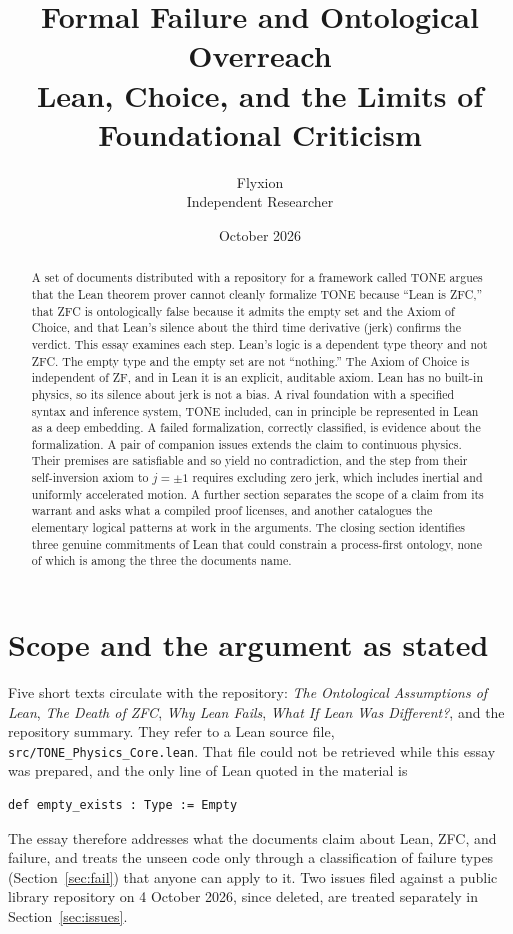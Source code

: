 \documentclass[11pt]{article}
\title{Formal Failure and Ontological Overreach\\[0.4em]\large Lean, Choice, and the Limits of Foundational Criticism}
\author{Flyxion\\Independent Researcher}
\date{October 2026}
\begin{document}
\maketitle

\begin{abstract}
\noindent A set of documents distributed with a repository for a framework called TONE argues that the Lean theorem prover cannot cleanly formalize TONE because ``Lean is ZFC,'' that ZFC is ontologically false because it admits the empty set and the Axiom of Choice, and that Lean's silence about the third time derivative (jerk) confirms the verdict. This essay examines each step. Lean's logic is a dependent type theory and not ZFC. The empty type and the empty set are not ``nothing.'' The Axiom of Choice is independent of ZF, and in Lean it is an explicit, auditable axiom. Lean has no built-in physics, so its silence about jerk is not a bias. A rival foundation with a specified syntax and inference system, TONE included, can in principle be represented in Lean as a deep embedding. A failed formalization, correctly classified, is evidence about the formalization. A pair of companion issues extends the claim to continuous physics. Their premises are satisfiable and so yield no contradiction, and the step from their self-inversion axiom to $j=\pm1$ requires excluding zero jerk, which includes inertial and uniformly accelerated motion. A further section separates the scope of a claim from its warrant and asks what a compiled proof licenses, and another catalogues the elementary logical patterns at work in the arguments. The closing section identifies three genuine commitments of Lean that could constrain a process-first ontology, none of which is among the three the documents name.
\end{abstract}

\section{Scope and the argument as stated}

Five short texts circulate with the repository: \emph{The Ontological Assumptions of Lean}, \emph{The Death of ZFC}, \emph{Why Lean Fails}, \emph{What If Lean Was Different?}, and the repository summary. They refer to a Lean source file, \texttt{src/TONE\_Physics\_Core.lean}. That file could not be retrieved while this essay was prepared, and the only line of Lean quoted in the material is
\begin{lstlisting}
def empty_exists : Type := Empty
\end{lstlisting}
The essay therefore addresses what the documents claim about Lean, ZFC, and failure, and treats the unseen code only through a classification of failure types (Section~\ref{sec:fail}) that anyone can apply to it. Two issues filed against a public library repository on 4 October 2026, since deleted, are treated separately in Section~\ref{sec:issues}.
\end{document}
